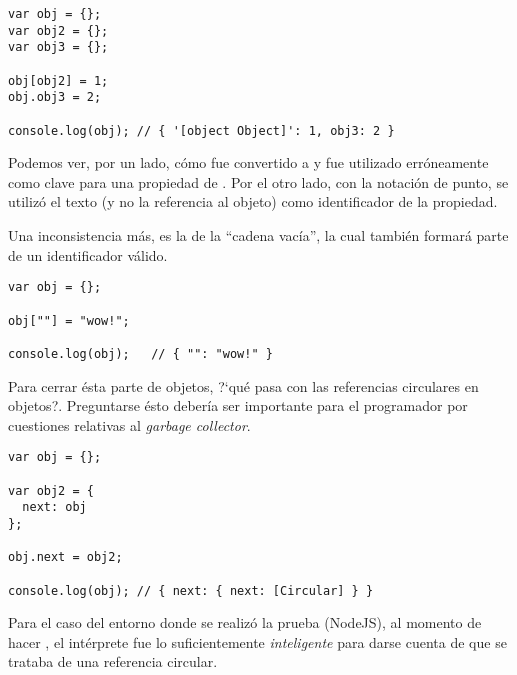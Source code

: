 \begin{lstlisting}[title={Utilizando objetos como claves}]
var obj = {};
var obj2 = {};
var obj3 = {};

obj[obj2] = 1;
obj.obj3 = 2;

console.log(obj); // ​​​​​{ '[object Object]': 1, obj3: 2 }​​​​​
\end{lstlisting}

Podemos ver, por un lado, cómo  fue convertido a  y fue utilizado erróneamente como clave para una propiedad de . Por el otro lado, con la notación de punto, se utilizó el texto  (y no la referencia al objeto) como identificador de la propiedad. 

Una inconsistencia más, es la de la "`cadena vacía"', la cual también formará parte de un identificador válido.

\begin{lstlisting}[title={Cadena vacía como clave}]
var obj = {};

obj[""] = "wow!";

console.log(obj);	// ​​​​​{ "": "wow!" }​​​​​ 
\end{lstlisting}

Para cerrar ésta parte de objetos, ?`qué pasa con las referencias circulares en objetos?. Preguntarse ésto debería ser importante para el programador por cuestiones relativas al \textit{garbage collector}.

\begin{lstlisting}[title={Referencias circulares con objetos}]
var obj = {};

var obj2 = {
  next: obj
};

obj.next = obj2;

console.log(obj); // { next: { next: [Circular] } }​​​​​
\end{lstlisting}

Para el caso del entorno donde se realizó la prueba (NodeJS), al momento de hacer , el intérprete fue lo suficientemente \textit{inteligente} para darse cuenta de que se trataba de una referencia circular.